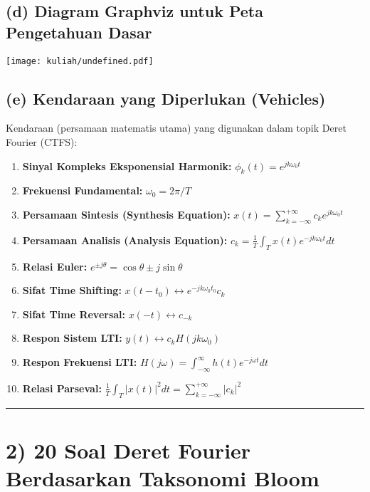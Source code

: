 \documentclass[
  letterpaper,
  DIV=11,
  numbers=noendperiod]{scrreprt}
\providecommand{\tightlist}{%
  \setlength{\itemsep}{0pt}\setlength{\parskip}{0pt}}
\begin{document}
\subsection{(d) Diagram Graphviz untuk Peta Pengetahuan
Dasar}\label{d-diagram-graphviz-untuk-peta-pengetahuan-dasar}

\texttt{[image: kuliah/undefined.pdf]}

\subsection{(e) Kendaraan yang Diperlukan
(Vehicles)}\label{e-kendaraan-yang-diperlukan-vehicles}

Kendaraan (persamaan matematis utama) yang digunakan dalam topik Deret
Fourier (CTFS):

\begin{enumerate}
\def\labelenumi{\arabic{enumi}.}
\tightlist
\item
  \textbf{Sinyal Kompleks Eksponensial Harmonik:}
  \(\phi_k(t) = e^{jk\omega_0 t}\)
\item
  \textbf{Frekuensi Fundamental:} \(\omega_0 = 2\pi/T\)
\item
  \textbf{Persamaan Sintesis (Synthesis Equation):}
  \(x(t) = \sum_{k=-\infty}^{+\infty} c_k e^{jk\omega_0 t}\)
\item
  \textbf{Persamaan Analisis (Analysis Equation):}
  \(c_k = \frac{1}{T} \int_T x(t) e^{-jk\omega_0 t} dt\)
\item
  \textbf{Relasi Euler:}
  \(e^{\pm j\theta} = \cos \theta \pm j \sin \theta\)
\item
  \textbf{Sifat Time Shifting:}
  \(x(t-t_0) \leftrightarrow e^{-jk\omega_0 t_0} c_k\)
\item
  \textbf{Sifat Time Reversal:} \(x(-t) \leftrightarrow c_{-k}\)
\item
  \textbf{Respon Sistem LTI:} \(y(t) \leftrightarrow c_k H(jk\omega_0)\)
\item
  \textbf{Respon Frekuensi LTI:}
  \(H(j\omega) = \int_{-\infty}^{\infty} h(t) e^{-j\omega t} dt\)
\item
  \textbf{Relasi Parseval:}
  \(\frac{1}{T} \int_T |x(t)|^2 dt = \sum_{k=-\infty}^{+\infty} |c_k|^2\)
\end{enumerate}

\begin{center}\rule{0.5\linewidth}{0.5pt}\end{center}

\section{2) 20 Soal Deret Fourier Berdasarkan Taksonomi
Bloom}\label{soal-deret-fourier-berdasarkan-taksonomi-bloom}
\end{document}
